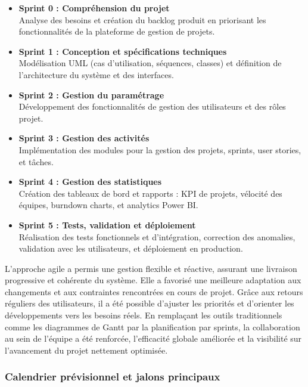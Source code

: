 \begin{itemize}
    \item \textbf{Sprint 0 : Compréhension du projet} \\
    Analyse des besoins et création du backlog produit en priorisant les fonctionnalités de la plateforme de gestion de projets.
    \item \textbf{Sprint 1 : Conception et spécifications techniques} \\
    Modélisation UML (cas d'utilisation, séquences, classes) et définition de l'architecture du système et des interfaces.
    \item \textbf{Sprint 2 : Gestion du paramétrage} \\
    Développement des fonctionnalités de gestion des utilisateurs et des rôles projet.
    \item \textbf{Sprint 3 : Gestion des activités} \\
    Implémentation des modules pour la gestion des projets, sprints, user stories, et tâches.
    \item \textbf{Sprint 4 : Gestion des statistiques} \\
    Création des tableaux de bord et rapports : KPI de projets, vélocité des équipes, burndown charts, et analytics Power BI.
    \item \textbf{Sprint 5 : Tests, validation et déploiement} \\
    Réalisation des tests fonctionnels et d'intégration, correction des anomalies, validation avec les utilisateurs, et déploiement en production.
\end{itemize}

L'approche agile a permis une gestion flexible et réactive, assurant une livraison progressive et cohérente du système. Elle a favorisé une meilleure adaptation aux changements et aux contraintes rencontrées en cours de projet. Grâce aux retours réguliers des utilisateurs, il a été possible d'ajuster les priorités et d'orienter les développements vers les besoins réels. En remplaçant les outils traditionnels comme les diagrammes de Gantt par la planification par sprints, la collaboration au sein de l'équipe a été renforcée, l'efficacité globale améliorée et la visibilité sur l'avancement du projet nettement optimisée.

\subsubsection{Calendrier prévisionnel et jalons principaux}

